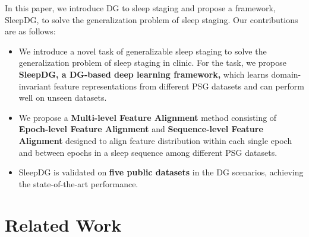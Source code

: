 \documentclass[letterpaper]{article} %
\begin{document}
	In this paper, we introduce DG to sleep staging and propose a framework, SleepDG, to solve the generalization problem of sleep staging.
	Our contributions are as follows:
	\begin{itemize}
		\item 
		We introduce a novel task of generalizable sleep staging to solve the generalization problem of sleep staging in clinic. For the task, we propose \textbf{SleepDG, a DG-based deep learning framework,} which learns domain-invariant feature representations from different  PSG datasets and can perform well on unseen datasets.
		
		\item
		We propose a \textbf{Multi-level Feature Alignment} method consisting of \textbf{Epoch-level Feature Alignment} and \textbf{Sequence-level Feature Alignment} designed to align feature distribution within each single epoch and between epochs in a sleep sequence among different PSG datasets. 
		
		\item
		SleepDG is validated on \textbf{five public datasets} in the DG scenarios, achieving the state-of-the-art performance.
	\end{itemize}
	
	
	\section{Related Work}
\end{document}
